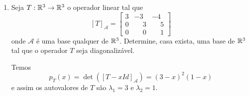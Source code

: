 \begin{exemplo}
\begin{enumerate}[label={\arabic*})]
\begin{solucao}
\begin{itemize}
\[				\]
				isto \'e, $x = iy$. Logo
				\[
					\aut_T(i) = \{(iy,y) \in \complex^2 \mid y \in \complex\} = [(i,1)].
				\]
				Assim, $\mathcal{B}_1 = \{(i,1)\}$ \'e uma base de $\aut_T(i)$ e da{\'\i} $\dim_\complex\aut_T(i) = 1$.
				\item Para $\lambda_1 = -i$ temos:
				\[
					[T + iId]_\mathcal{A} = \begin{bmatrix} i & -1\\1 & \phantom{-}i\end{bmatrix}
				\]
				e assim $(x,y) \in \aut_T(-i)$ se, e s\'o se,
				\[
					\begin{bmatrix} i & -1\\1 & \phantom{-}i\end{bmatrix} \begin{bmatrix} x\\y\end{bmatrix}	 = \begin{bmatrix} 0\\0\end{bmatrix},
				\]
				isto \'e, $x = -iy$. Logo
				\[
					\aut_T(-i) = \{(-iy,y) \in \complex^2 \mid y \in \complex\} = [(-i,1)].
				\]
				Assim, $\mathcal{B}_2 = \{(-i,1)\}$ \'e uma base de $\aut_T(-i)$ e da{\'\i} $\dim_\complex\aut_T(-i) = 1$.
			\end{itemize}
			Agora o conjunto $\mathcal{B} = \mathcal{B}_1 \cup \mathcal{B}_2 = \{(i,1);(-i,1)\}$ \'e uma base de $\complex^2$ e nesta base temos
			\[
				[T]_\mathcal{B} = \begin{bmatrix} i & \phantom{-}0\\0 & -i\end{bmatrix}.
			\]
		\end{solucao}
		\item Seja $T : \mathbb{R}^3 \to \mathbb{R}^3$ o operador linear tal que
		\[
			[T]_\mathcal{A} = \begin{bmatrix}
								3 & -3 & -4\\
								0 & \phantom{-}3 & \phantom{-}5\\
								0 & \phantom{-}0 & \phantom{-}1
							\end{bmatrix}
		\]
		onde $\mathcal{A}$ \'e uma base qualquer de $\mathbb{R}^3$. Determine, casa exista, uma base de $\mathbb{R}^3$ tal que o operador $T$ seja diagonaliz\'avel.
		\begin{solucao}
			Temos
			\[
				p_T(x) = \det([T - xId]_\mathcal{A}) = (3 - x)^2(1 - x)
			\]
			e assim os autovalores de $T$ s\~ao $\lambda_1 = 3$ e $\lambda_2 = 1$.
			\begin{itemize}

\end{itemize}
\end{solucao}
\end{enumerate}
\end{exemplo}
